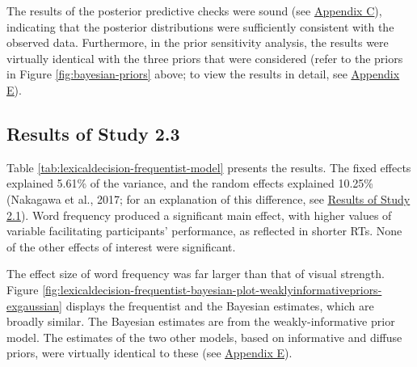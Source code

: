 \documentclass[
  12pt,
  man,floatsintext]{apa7}
\begin{document}
The results of the posterior predictive checks were sound (see \protect\hyperlink{appendix-C-Bayesian-analysis-diagnostics}{\underline{Appendix C}}), indicating that the posterior distributions were sufficiently consistent with the observed data. Furthermore, in the prior sensitivity analysis, the results were virtually identical with the three priors that were considered (refer to the priors in Figure \ref{fig:bayesian-priors} above; to view the results in detail, see \protect\hyperlink{appendix-E-Bayesian-analysis-results}{\underline{Appendix E}}).

\hypertarget{results-of-study-2.3}{%
\subsection{Results of Study 2.3}\label{results-of-study-2.3}}

Table \ref{tab:lexicaldecision-frequentist-model} presents the results. The fixed effects explained 5.61\% of the variance, and the random effects explained 10.25\% (Nakagawa et al., 2017; for an explanation of this difference, see \protect\hyperlink{semanticpriming-results}{\underline{Results of Study 2.1}}). Word frequency produced a significant main effect, with higher values of variable facilitating participants' performance, as reflected in shorter RTs. None of the other effects of interest were significant.

The effect size of word frequency was far larger than that of visual strength. Figure \ref{fig:lexicaldecision-frequentist-bayesian-plot-weaklyinformativepriors-exgaussian} displays the frequentist and the Bayesian estimates, which are broadly similar. The Bayesian estimates are from the weakly-informative prior model. The estimates of the two other models, based on informative and diffuse priors, were virtually identical to these (see \protect\hyperlink{appendix-E-Bayesian-analysis-results}{\underline{Appendix E}}).

\FloatBarrier
\end{document}
